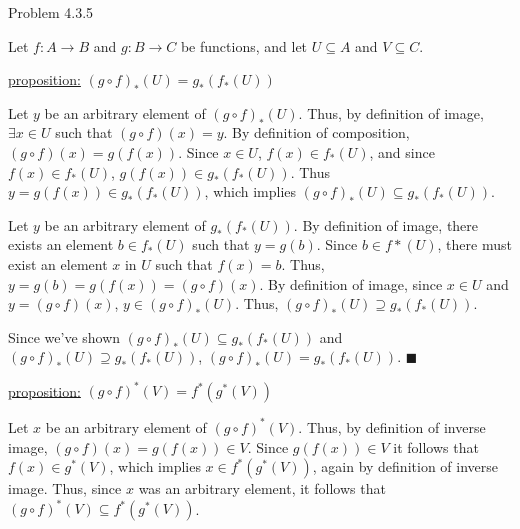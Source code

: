 \documentclass{article}
\theoremstyle{definition}
\begin{document}
	\vspace{1cm}


	\noindent Problem 4.3.5  \vspace{0.3cm}

	Let $f:A\rightarrow B$ and $g:B\rightarrow C$ be functions, and let
	$U\subseteq A$ and $V\subseteq C$.

	\vspace{0.3cm}

	\underline{proposition:} $(g\circ f)_*(U)=g_*(f_*(U))$

	\vspace{0.2cm}


	\vspace{0.15cm}

	Let $y$ be an arbitrary element of $(g\circ f)_*(U)$. Thus, by
	definition of image, $\exists x\in U$ such that $(g\circ f)(x)=y$.
	By definition of composition, $(g\circ f)(x)=g(f(x)).$  Since $x\in
	U$, $f(x)\in f_*(U)$, and since $f(x)\in f_*(U)$, $g(f(x))\in
	g_*(f_*(U))$. Thus $y=g(f(x))\in g_*(f_*(U))$, which implies $(g\circ
	f)_*(U)\subseteq g_*(f_*(U))$.

	Let $y$ be an arbitrary element of $g_*(f_*(U))$. By definition of
	image, there exists an element $b\in f_*(U)$ such that $y=g(b)$.
	Since $b\in f*(U)$, there must exist an element $x$ in $U$ such that
	$f(x)=b$. Thus, $y=g(b)=g(f(x))=(g\circ f)(x)$. By definition of
	image, since $x\in U$ and $y=(g\circ f)(x)$, $y\in (g\circ f)_*(U)$.
	Thus, $(g\circ
	f)_*(U)\supseteq g_*(f_*(U))$.

	Since we've shown $(g\circ
	f)_*(U)\subseteq g_*(f_*(U))$ and $(g\circ
	f)_*(U)\supseteq g_*(f_*(U))$, $(g\circ
	f)_*(U)= g_*(f_*(U))$.  $\blacksquare$


	\vspace{0.3cm}

	\underline{proposition:} $(g\circ f)^*(V)=f^*(g^*(V))$

	\vspace{0.2cm}


	\vspace{0.15cm}

	Let $x$ be an arbitrary element of $(g\circ f)^*(V)$. Thus, by
	definition of inverse image, $(g\circ f)(x)=g(f(x))\in V$. Since
	$g(f(x))\in V$ it follows that $f(x)\in g^*(V)$, which implies $x\in
	f^*(g^*(V))$, again by definition of inverse image. Thus, since $x$
	was an arbitrary element, it follows that $(g\circ f)^*(V)\subseteq
	f^*(g^*(V))$.
\end{document}
